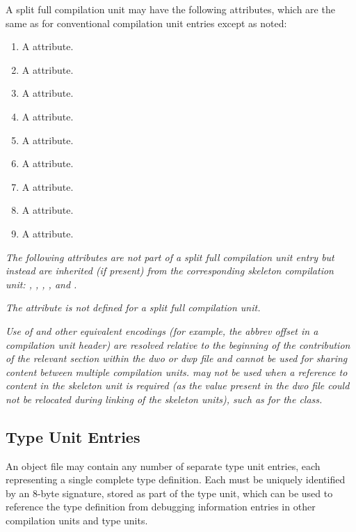 A split full compilation unit 
may have the following attributes, 
which are the same as for conventional compilation unit entries 
except as noted:
\begin{enumerate}[1. ]
\item A \DWATname{} attribute.
\bb
\item A \DWATlanguagename{} attribute.
\item A \DWATlanguageversion{} attribute.
\eb
\item A \DWATmacros{} attribute.\db
\item A \DWATproducer{} attribute.        
\item A \DWATidentifiercase{} attribute.
\item A \DWATmainsubprogram{} attribute.
\item A \DWATentrypc{} attribute.
\item A \DWATuseUTFeight{} attribute.

\end{enumerate}

\textit{The following attributes are not part of a 
split full compilation unit entry but instead are inherited 
(if present) from the corresponding skeleton compilation unit: 
\bbeb
\DWATaddrbase{},
\DWATcompdir,
\DWAThighpc,
\DWATlowpc,
\DWATranges{}
\db
and
\DWATstmtlist.\db 
}

\textit{The \DWATbasetypes{} attribute is not defined for a
split full compilation unit.}

\bb
\textit{Use of \DWFORMsecoffset{} and other equivalent encodings 
(for example, the abbrev offset in a compilation unit header) are resolved 
relative to the beginning of the contribution of the relevant 
section within the dwo or dwp file and cannot be used for sharing 
content between multiple compilation units. \DWFORMsecoffset{} may 
not be used when a reference to content in the skeleton unit is 
required (as the value present in the dwo file could not be relocated 
during linking of the skeleton units), such as for the \CLASSaddrptr{} class.}
\eb

\subsection{Type Unit Entries}
\label{chap:typeunitentries}
An object file may contain any number of separate type
unit entries, each representing a single complete type
definition. 
Each  must be uniquely identified by
an 8-byte signature, stored as part of the type unit, which
can be used to reference the type definition from debugging
information entries in other compilation units and type units.

